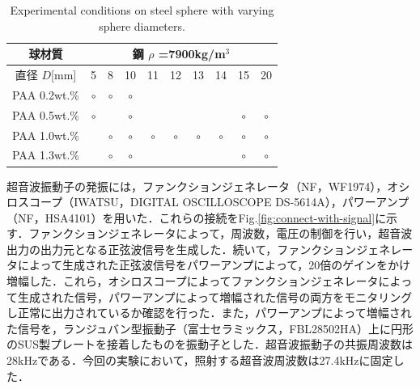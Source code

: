 \begin{table}[h]
    \centering
    \caption{Experimental conditions on steel sphere with varying sphere diameters.}
    \label{table:exp-conditions-dia}
    \begin{tabular}{c|c|c|c|c|c|c|c|c|c}\hline
        球材質       & \multicolumn{9}{|c}{鋼 $\rho$ =7900kg/m$^3$}                                                                                 \\ \hline
        直径 $D$[mm] & 5                                            & 8       & 10      & 11      & 12      & 13      & 14      & 15      & 20      \\ \hline \hline
        PAA 0.2wt.\% & $\circ$                                      & $\circ$ & $\circ$ &         &         &         &         &         &         \\ \hline
        PAA 0.5wt.\% & $\circ$                                      &         & $\circ$ &         &         &         &         & $\circ$ & $\circ$ \\ \hline
        PAA 1.0wt.\% &                                              & $\circ$ & $\circ$ & $\circ$ & $\circ$ & $\circ$ & $\circ$ & $\circ$ & $\circ$ \\ \hline
        PAA 1.3wt.\% &                                              & $\circ$ & $\circ$ &         &         &         &         & $\circ$ & $\circ$ \\ \hline
    \end{tabular}
\end{table}

\newpage

超音波振動子の発振には，ファンクションジェネレータ（NF，WF1974），オシロスコープ（IWATSU，DIGITAL OSCILLOSCOPE DS-5614A），パワーアンプ（NF，HSA4101）を用いた．これらの接続をFig.\ref{fig:connect-with-signal}に示す．ファンクションジェネレータによって，周波数，電圧の制御を行い，超音波出力の出力元となる正弦波信号を生成した．続いて，ファンクションジェネレータによって生成された正弦波信号をパワーアンプによって，20倍のゲインをかけ増幅した．これら，オシロスコープによってファンクションジェネレータによって生成された信号，パワーアンプによって増幅された信号の両方をモニタリングし正常に出力されているか確認を行った．また，パワーアンプによって増幅された信号を，ランジュバン型振動子（富士セラミックス，FBL28502HA）上に円形のSUS製プレートを接着したものを振動子とした．超音波振動子の共振周波数は28kHzである．今回の実験において，照射する超音波周波数は27.4kHzに固定した．

